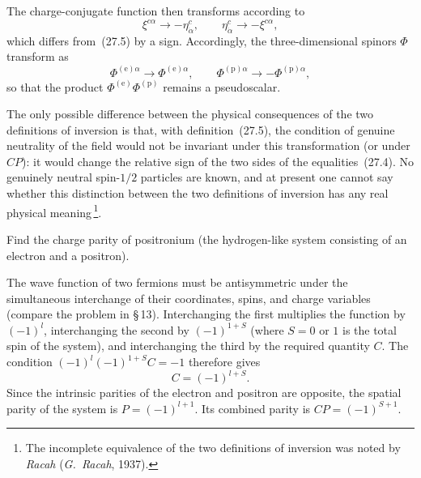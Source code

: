 The charge-conjugate function then transforms according to
\[
\xi^{c\alpha} \to -\eta^c_{\dot\alpha},\qquad \eta^c_{\dot\alpha} \to -\xi^{c\alpha},
\]
which differs from~(27.5) by a sign. Accordingly, the three-dimensional spinors $\Phi$ transform as
\[
\Phi^{(\text{e})\alpha} \to \Phi^{(\text{e})\alpha},\qquad \Phi^{(\text{p})\alpha} \to -\Phi^{(\text{p})\alpha},
\]
so that the product $\Phi^{(\text{e})}\Phi^{(\text{p})}$ remains a pseudoscalar.

The only possible difference between the physical consequences of the two definitions of inversion is that, with definition~(27.5), the condition of genuine neutrality of the field would not be invariant under this transformation (or under $CP$): it would change the relative sign of the two sides of the equalities~(27.4). No genuinely neutral spin-$1/2$ particles are known, and at present one cannot say whether this distinction between the two definitions of inversion has any real physical meaning\,\footnote{The incomplete equivalence of the two definitions of inversion was noted by \emph{Racah} (\emph{G.~Racah}, 1937).}.

\ProblemHeading
Find the charge parity of positronium (the hydrogen-like system consisting of an electron and a positron).

\SolutionHeading The wave function of two fermions must be antisymmetric under the simultaneous interchange of their coordinates, spins, and charge variables (compare the problem in \S\,13). Interchanging the first multiplies the function by $(-1)^l$, interchanging the second by $(-1)^{1+S}$ (where $S = 0$ or $1$ is the total spin of the system), and interchanging the third by the required quantity $C$. The condition $(-1)^l(-1)^{1+S}C = -1$ therefore gives
\[
C = (-1)^{l+S}.
\]
Since the intrinsic parities of the electron and positron are opposite, the spatial parity of the system is $P = (-1)^{l+1}$. Its combined parity is $CP = (-1)^{S+1}$.
